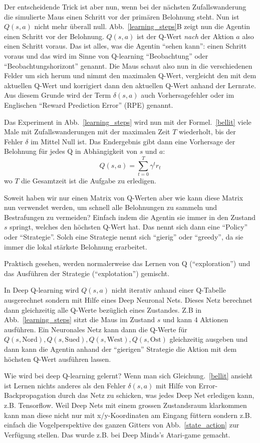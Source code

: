 \documentclass[12pt]{report}
\begin{document}
Der entscheidende Trick ist aber nun, wenn bei der n\"achsten
Zufallswanderung die simulierte Maus einen Schritt vor der prim\"aren
Belohnung steht. Nun ist $Q(s,a)$ nicht mehr überall
null. Abb.~\ref{learning_steps}B zeigt nun die Agentin einen Schritt
vor der Belohnung. $Q(s,a)$ ist der Q-Wert \textsl{nach} der Aktion
$a$ also einen Schritt voraus. Das ist alles, was die Agentin ``sehen
kann'': einen Schritt voraus und das wird im Sinne von Q-learning
``Beobachtung'' oder ``Beobachtungshorizont'' genannt. Die Maus schaut
also nun in die verschiedenen Felder um sich herum und nimmt den
maximalen Q-Wert, vergleicht den mit dem aktuellen Q-Wert und
korrigiert dann den aktuellen Q-Wert anhand der Lernrate. Aus diesem
Grunde wird der Term $\delta(s,a)$ auch Vorhersagefehler oder im
Englischen ``Reward Prediction Error'' (RPE) genannt.

Das Experiment in Abb.~\ref{learning_steps} wird nun mit der
Formel.~\ref{bellit} viele Male mit Zufallswanderungen mit der maximalen
Zeit $T$ wiederholt, bis der Fehler $\delta$ im Mittel Null
ist. Das Endergebnis gibt dann eine Vorhersage der
Belohnung f\"ur jedes Q in Abhängigkeit von $s$ und $a$:
\begin{equation}
  Q(s,a) = \sum_{t=0}^T \gamma^t r_t
\end{equation}
wo $T$ die Gesamtzeit ist die Aufgabe zu erledigen.

Soweit haben wir nur einen Matrix von Q-Werten aber wie kann diese
Matrix nun verwendet werden, um schnell alle Belohnungen zu sammeln
und Bestrafungen zu vermeiden? Einfach indem die Agentin sie immer in
den Zustand $s$ springt, welches den h\"ochsten Q-Wert hat. Das nennt
sich dann eine ``Policy'' oder ``Strategie''. Solch eine Strategie
nennt sich ``gierig'' oder ``greedy'', da sie immer die lokal stärkste
Belohnung erarbeitet.

Praktisch gesehen, werden normalerweise das Lernen von Q
(``exploration'') und das Ausführen der Strategie (``explotation'')
gemischt.

In Deep Q-learning wird $Q(s,a)$ nicht iterativ anhand einer Q-Tabelle
ausgerechnet sondern mit Hilfe eines Deep Neuronal Nets. Dieses Netz
berechnet dann gleichzeitig alle Q-Werte bezüglich eines
Zustandes. Z.B in Abb.~\ref{learning_steps} sitzt die Maus im Zustand
$s$ und kann 4 Aktionen ausf\"uhren. Ein Neuronales Netz kann dann die
Q-Werte f\"ur $Q(s,\textrm{Nord}), Q(s,\textrm{Sued}),
Q(s,\textrm{West}), Q(s,\textrm{Ost})$ gleichzeitig ausgeben und dann
kann die Agentin anhand der ``gierigen'' Strategie die Aktion mit dem
h\"ochsten Q-Wert ausf\"uhren lassen.

Wie wird bei deep Q-learning gelernt? Wenn man sich
Gleichung.~\ref{bellit} ansieht ist Lernen nichts anderes als den
Fehler $\delta(s,a)$ mit Hilfe von Error-Backpropagation durch das
Netz zu schicken, was jedes Deep Net erledigen kann,
z.B. Tensorflow. Weil Deep Nets mit einem grossen Zustandsraum
klarkommen kann man diese nicht nur mit x/y-Koordinaten am Eingang
f\"uttern sondern z.B. einfach die Vogelperspektive des ganzen Gitters
von Abb.~\ref{state_action} zur Verfügung stellen. Das wurde z.B. bei
Deep Minds's Atari-game gemacht.
\end{document}
